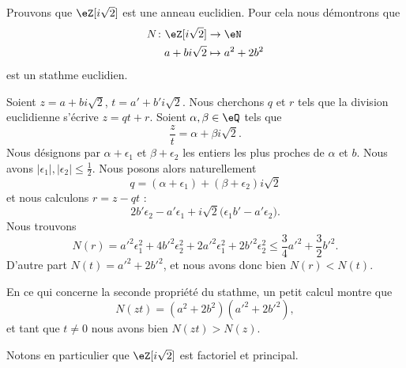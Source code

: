 \begin{example} \label{ExeDufyZI}
    Prouvons que \( \eZ[i\sqrt{2}]\) est une anneau euclidien. Pour cela nous démontrons que
    \begin{equation}    \label{EqOZUIooZGmHWl}
        \begin{aligned}
            N\colon \eZ[i\sqrt{2}]&\to \eN \\
            a+bi\sqrt{2}&\mapsto a^2+2b^2
        \end{aligned}
    \end{equation}
    est un stathme euclidien.

    Soient \( z=a+bi\sqrt{2}\), \( t=a'+b'i\sqrt{2}\). Nous cherchons \( q\) et \( r\) tels que la division euclidienne s'écrive \( z=qt+r\). Soient \( \alpha,\beta\in \eQ\) tels que
    \begin{equation}
        \frac{ z }{ t }=\alpha+\beta i\sqrt{2}.
    \end{equation}
    Nous désignons par \( \alpha+\epsilon_1\) et \( \beta+\epsilon_2\) les entiers les plus proches de \( \alpha\) et \( b\). Nous avons \( | \epsilon_1 |,| \epsilon_2 |\leq \frac{ 1 }{2}\). Nous posons alors naturellement
    \begin{equation}
        q=(\alpha+\epsilon_1)+(\beta+\epsilon_2)i\sqrt{2}
    \end{equation}
    et nous calculons \( r=z-qt\) :
    \begin{equation}
        2b'\epsilon_2-a'\epsilon_1+i\sqrt{2}\big( \epsilon_1b'-a'\epsilon_2 \big).
    \end{equation}
    Nous trouvons
    \begin{equation}
        N(r)=a'^2\epsilon_1^2+4b'^2\epsilon_2^2+2a'^2\epsilon_1^2+2b'^2\epsilon_2^2\leq \frac{ 3 }{ 4 }a'^2+\frac{ 3 }{2}b'^2.
    \end{equation}
    D'autre part \( N(t)=a'^2+2b'^2\), et nous avons donc bien \( N(r)<N(t)\).

    En ce qui concerne la seconde propriété du stathme, un petit calcul montre que
    \begin{equation}
        N(zt)=(a^2+2b^2)(a'^2+2b'^2),
    \end{equation}
    et tant que \( t\neq 0\) nous avons bien \( N(zt)>N(z)\).
\end{example}

Notons en particulier que \( \eZ[i\sqrt{2}]\) est factoriel et principal.

